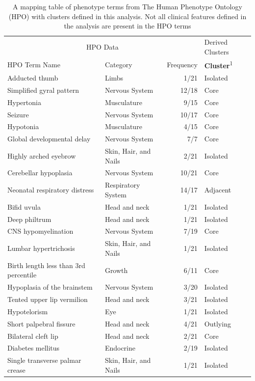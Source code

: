 \documentclass[
  authoryear,
  preprint,
  3p]{elsarticle}
\begin{document}
\hypertarget{tbl-hpo}{}
\setlength{\LTpost}{0mm}
\begin{longtable}{llrl}
\caption{\label{tbl-hpo}A mapping table of phenotype terms from The Human Phenotype Ontology
(HPO) with clusters defined in this analysis. Not all clinical features
defined in the analysis are present in the HPO terms }\tabularnewline

\toprule
\multicolumn{3}{c}{HPO Data} & Derived Clusters \\ 
\cmidrule(lr){1-3} \cmidrule(lr){4-4}
HPO Term Name & Category & Frequency & \textbf{Cluster}\textsuperscript{1} \\ 
\midrule
Adducted thumb & Limbs & 1/21 & Isolated \\ 
Simplified gyral pattern & Nervous System & 12/18 & Core \\ 
Hypertonia & Musculature & 9/15 & Core \\ 
Seizure & Nervous System & 10/17 & Core \\ 
Hypotonia & Musculature & 4/15 & Core \\ 
Global developmental delay & Nervous System & 7/7 & Core \\ 
Highly arched eyebrow & Skin, Hair, and Nails & 2/21 & Isolated \\ 
Cerebellar hypoplasia & Nervous System & 10/21 & Core \\ 
Neonatal respiratory distress & Respiratory System & 14/17 & Adjacent \\ 
Bifid uvula & Head and neck & 1/21 & Isolated \\ 
Deep philtrum & Head and neck & 1/21 & Isolated \\ 
CNS hypomyelination & Nervous System & 7/19 & Core \\ 
Lumbar hypertrichosis & Skin, Hair, and Nails & 1/21 & Isolated \\ 
Birth length less than 3rd percentile & Growth & 6/11 & Core \\ 
Hypoplasia of the brainstem & Nervous System & 3/20 & Isolated \\ 
Tented upper lip vermilion & Head and neck & 3/21 & Isolated \\ 
Hypotelorism & Eye & 1/21 & Isolated \\ 
Short palpebral fissure & Head and neck & 4/21 & Outlying \\ 
Bilateral cleft lip & Head and neck & 2/21 & Core \\ 
Diabetes mellitus & Endocrine & 2/19 & Isolated \\ 
Single transverse palmar crease & Skin, Hair, and Nails & 1/21 & Isolated \\ 

\end{longtable}
\end{document}
